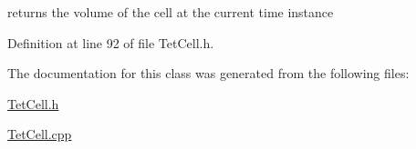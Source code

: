 returns the volume of the cell at the current time instance 



Definition at line 92 of file Tet\-Cell.\-h.



The documentation for this class was generated from the following files\-:\begin{DoxyCompactItemize}
\item 
\hyperlink{_tet_cell_8h}{Tet\-Cell.\-h}\item 
\hyperlink{_tet_cell_8cpp}{Tet\-Cell.\-cpp}\end{DoxyCompactItemize}
